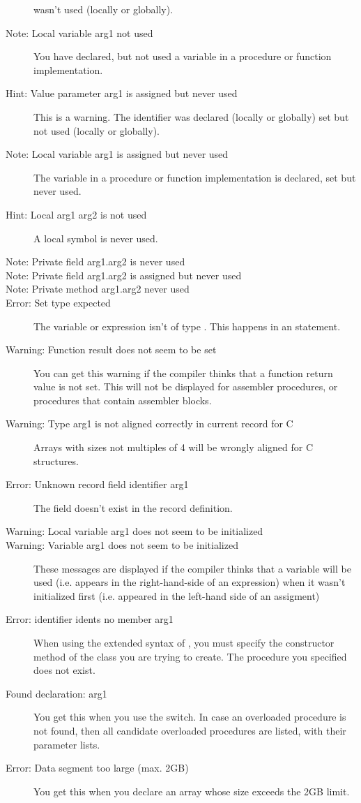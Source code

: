 \begin{description}
 wasn't used (locally or globally).
\item [Note: Local variable arg1 not used]
 You have declared, but not used a variable in a procedure or function
 implementation.
\item [Hint: Value parameter arg1 is assigned but never used]
 This is a warning. The identifier was declared (locally or globally)
 set but not used (locally or globally).
\item [Note: Local variable arg1 is assigned but never used]
 The variable in a procedure or function
 implementation is declared, set but never used.
\item [Hint: Local arg1 arg2 is not used]
 A local symbol is never used.
\item [Note: Private field arg1.arg2 is never used]
\item [Note: Private field arg1.arg2 is assigned but never used]
\item [Note: Private method arg1.arg2 never used]
\item [Error: Set type expected]
 The variable or expression isn't of type . This happens in an
  statement.
\item [Warning: Function result does not seem to be set]
 You can get this warning if the compiler thinks that a function return
 value is not set. This will not be displayed for assembler procedures,
 or procedures that contain assembler blocks.
\item [Warning: Type arg1 is not aligned correctly in current record for C]
 Arrays with sizes not multiples of 4 will be wrongly aligned
 for C structures.
\item [Error: Unknown record field identifier arg1]
 The field doesn't exist in the record definition.
\item [Warning: Local variable arg1 does not seem to be initialized]
\item [Warning: Variable arg1 does not seem to be initialized]
 These messages are displayed if the compiler thinks that a variable will
 be used (i.e. appears in the right-hand-side of an expression) when it
 wasn't initialized first (i.e. appeared in the left-hand side of an
 assigment)
\item [Error: identifier idents no member arg1]
 When using the extended syntax of , you must specify the constructor
 method of the class you are trying to create. The procedure you specified
 does not exist.
\item [Found declaration: arg1]
 You get this when you use the  switch. In case an overloaded
 procedure is not found, then all candidate overloaded procedures are
 listed, with their parameter lists.
\item [Error: Data segment too large (max. 2GB)]
 You get this when you declare an array whose size exceeds the 2GB limit.
 \end{description}
